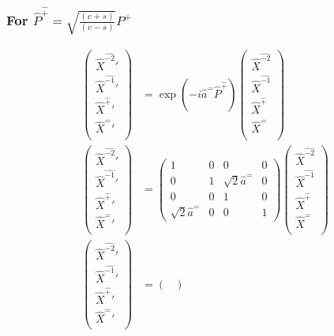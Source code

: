 \documentclass[]{article}
\numberwithin{equation}{section}
\begin{document}
{{\subsubsection{For $\hat{P}^{\hat{+}}=\sqrt{\frac{(c+s)}{(c-s)}}P^{{+}}$}
\begin{align}
\begin{pmatrix}
    \hat{X}^{\hat{-2}}'\\
    \hat{X}^{\hat{-1}}'\\
    \hat{X}^{\hat{+}}'\\
    \hat{X}^{\hat{-}}'\\
    \end{pmatrix}&= \exp{(-i\hat{a}^{\hat{-}}\hat{P}^{\hat{+}})}\begin{pmatrix}
    \hat{X}^{\hat{-2}}\\
    \hat{X}^{\hat{-1}}\\
    \hat{X}^{\hat{+}}\\
    \hat{X}^{\hat{-}}\\
    \end{pmatrix}\\
    \begin{pmatrix}
    \hat{X}^{\hat{-2}}'\\
    \hat{X}^{\hat{-1}}'\\
    \hat{X}^{\hat{+}}'\\
    \hat{X}^{\hat{-}}'\\
    \end{pmatrix}&= \begin{pmatrix}
        1&0&0&0\\
        0&1&\sqrt{2}\hat{a}^{\hat{-}}&0\\
        0&0&1&0\\
        \sqrt{2}\hat{a}^{\hat{-}}&0&0&1
    \end{pmatrix}\begin{pmatrix}
    \hat{X}^{\hat{-2}}\\
    \hat{X}^{\hat{-1}}\\
    \hat{X}^{\hat{+}}\\
    \hat{X}^{\hat{-}}\\
    \end{pmatrix}\\
    \begin{pmatrix}
    \hat{X}^{\hat{-2}}'\\
    \hat{X}^{\hat{-1}}'\\
    \hat{X}^{\hat{+}}'\\
    \hat{X}^{\hat{-}}'\\
    \end{pmatrix}&= \begin{pmatrix}

\end{pmatrix}
\end{align}}}
\end{document}
